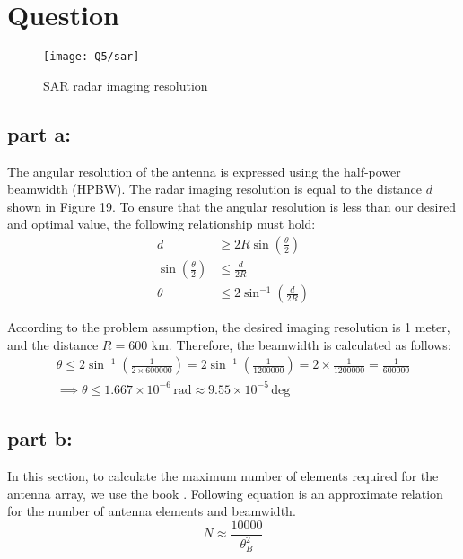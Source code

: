 \documentclass[12pt,onecolumn,a4paper]{article}
\newcommand\question{
	\section{Question \numberstringnum{\thesection}}
}
\begin{document}
	
	
	\FloatBarrier
	\question%
	
	\begin{figure}[H]
		\centering
		\texttt{[image: Q5/sar]}
		\caption{SAR radar imaging resolution}
		\label{fig:sar}
	\end{figure}
	
	
	\FloatBarrier
	\subsection{part a:}
	
	The angular resolution of the antenna is expressed using the half-power beamwidth (HPBW). The radar imaging resolution is equal to the distance $d$ shown in Figure 19. To ensure that the angular resolution is less than our desired and optimal value, the following relationship must hold:
	\begin{align}
		d &\geq 2R \sin\left(\frac{\theta}{2}\right) \\ \sin\left(\frac{\theta}{2}\right) &\leq \frac{d}{2R} \\
		 \theta &\leq 2 \sin^{-1}\left(\frac{d}{2R}\right)
	\end{align}
	
	According to the problem assumption, the desired imaging resolution is 1 meter, and the distance $R = 600$ km. Therefore, the beamwidth is calculated as follows:
	\begin{gather}
		\theta \leq 2 \sin^{-1} \left( \frac{1}{2 \times 600000} \right) = 2 \sin^{-1} \left( \frac{1}{1200000} \right) = 2 \times \frac{1}{1200000} = \frac{1}{600000} \\
		\implies \theta \leq 1.667 \times 10^{-6} \, \text{rad} \approx 9.55 \times 10^{-5} \, \text{deg}
	\end{gather}
	
	\FloatBarrier
	\subsection{part b:}
	
	In this section, to calculate the maximum number of elements required for the antenna array, we use the book \cite{book:RadarHandbook}. Following equation is an approximate relation for the number of antenna elements and beamwidth.
	\begin{equation}
		N \approx \frac{10000}{\theta_B^2}
	\end{equation}
	
\end{document}

